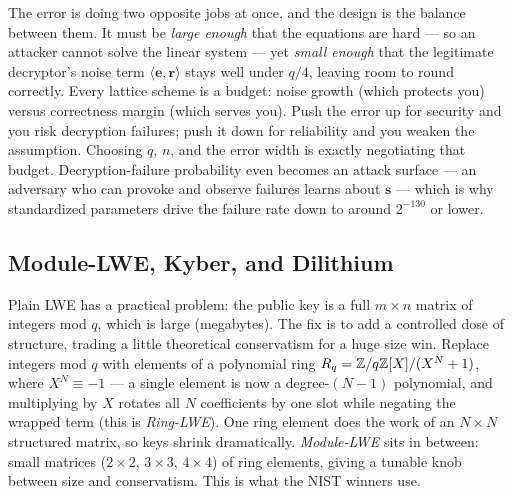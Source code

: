 \begin{whybox}
The error is doing two opposite jobs at once, and the design is the balance between them. It must be \emph{large enough} that the equations are hard --- so an attacker cannot solve the linear system --- yet \emph{small enough} that the legitimate decryptor's noise term $\langle\mathbf e,\mathbf r\rangle$ stays well under $q/4$, leaving room to round correctly. Every lattice scheme is a budget: noise growth (which protects you) versus correctness margin (which serves you). Push the error up for security and you risk decryption failures; push it down for reliability and you weaken the assumption. Choosing $q$, $n$, and the error width is exactly negotiating that budget. Decryption-failure probability even becomes an attack surface --- an adversary who can provoke and observe failures learns about $\mathbf s$ --- which is why standardized parameters drive the failure rate down to around $2^{-130}$ or lower.
\end{whybox}

\subsection{Module-LWE, Kyber, and Dilithium}
\label{ch35:kyber-dilithium}

Plain LWE has a practical problem: the public key is a full $m\times n$ matrix of integers mod $q$, which is large (megabytes). The fix is to add a controlled dose of structure, trading a little theoretical conservatism for a huge size win. Replace integers mod $q$ with elements of a polynomial ring $R_q = \mathbb{Z}/q\mathbb{Z}[X]/(X^N+1)$, where $X^N \equiv -1$ --- a single element is now a degree-$(N-1)$ polynomial, and multiplying by $X$ rotates all $N$ coefficients by one slot while negating the wrapped term (this is \emph{Ring-LWE}). One ring element does the work of an $N\times N$ structured matrix, so keys shrink dramatically. \emph{Module-LWE} sits in between: small matrices ($2\times2$, $3\times3$, $4\times4$) of ring elements, giving a tunable knob between size and conservatism. This is what the NIST winners use.


